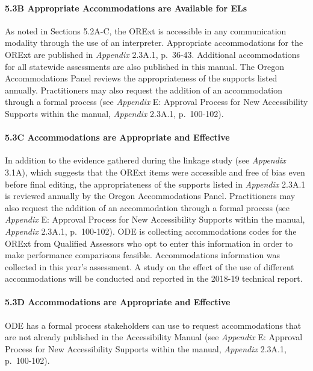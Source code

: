 \documentclass[]{article}
\let\oldparagraph\paragraph
\renewcommand{\paragraph}[1]{\oldparagraph{#1}\mbox{}}
\begin{document}
\paragraph{5.3B Appropriate Accommodations are Available for
ELs}\label{b-appropriate-accommodations-are-available-for-els}

As noted in Sections 5.2A-C, the ORExt is accessible in any
communication modality through the use of an interpreter. Appropriate
accommodations for the ORExt are published in \emph{Appendix} 2.3A.1,
p.~36-43. Additional accommodations for all statewide assessments are
also published in this manual. The Oregon Accommodations Panel reviews
the appropriateness of the supports listed annually. Practitioners may
also request the addition of an accommodation through a formal process
(see \emph{Appendix} E: Approval Process for New Accessibility Supports
within the manual, \emph{Appendix} 2.3A.1, p.~100-102).

\paragraph{5.3C Accommodations are Appropriate and
Effective}\label{c-accommodations-are-appropriate-and-effective}

In addition to the evidence gathered during the linkage study (see
\emph{Appendix} 3.1A), which suggests that the ORExt items were
accessible and free of bias even before final editing, the
appropriateness of the supports listed in \emph{Appendix} 2.3A.1 is
reviewed annually by the Oregon Accommodations Panel. Practitioners may
also request the addition of an accommodation through a formal process
(see \emph{Appendix} E: Approval Process for New Accessibility Supports
within the manual, \emph{Appendix} 2.3A.1, p.~100-102). ODE is
collecting accommodations codes for the ORExt from Qualified Assessors
who opt to enter this information in order to make performance
comparisons feasible. Accommodations information was collected in this
year's assessment. A study on the effect of the use of different
accommodations will be conducted and reported in the 2018-19 technical
report.

\paragraph{5.3D Accommodations are Appropriate and
Effective}\label{d-accommodations-are-appropriate-and-effective}

ODE has a formal process stakeholders can use to request accommodations
that are not already published in the Accessibility Manual (see
\emph{Appendix} E: Approval Process for New Accessibility Supports
within the manual, \emph{Appendix} 2.3A.1, p.~100-102).
\end{document}
